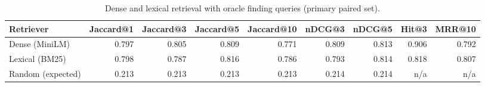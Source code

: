 \begin{table}[t]
\centering
\scriptsize
\begin{tabular}{lrrrrrrrr}
\hline
Retriever & Jaccard@1 & Jaccard@3 & Jaccard@5 & Jaccard@10 & nDCG@3 & nDCG@5 & Hit@3 & MRR@10 \\
\hline
Dense (MiniLM) & 0.797 & 0.805 & 0.809 & 0.771 & 0.809 & 0.813 & 0.906 & 0.792 \\
Lexical (BM25) & 0.798 & 0.787 & 0.816 & 0.786 & 0.793 & 0.814 & 0.818 & 0.807 \\
Random (expected) & 0.213 & 0.213 & 0.213 & 0.213 & 0.214 & 0.214 & n/a & n/a \\
\hline
\end{tabular}
\caption{Dense and lexical retrieval with oracle finding queries (primary paired set).}
\label{tab:table2_dense_vs_lexical_baseline}
\end{table}
